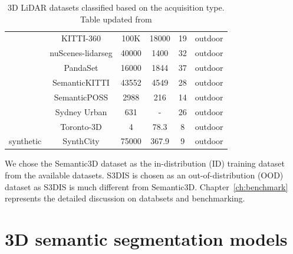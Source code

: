 \begin{table}[h!]
\begin{tabular}{c|c|c|c|c|c}
                                        & KITTI-360\cite{Xie_2016_CVPR_KITTI_360} & 100K & 18000 & 19 & outdoor\\ %
                                        & nuScenes-lidarseg\cite{caesar2020nuscenes} & 40000 & 1400 & 32& outdoor\\ %
                                        & PandaSet\cite{PandaSet} & 16000 & 1844 & 37 & outdoor \\ %
                                        & SemanticKITTI\cite{Behley_2019_ICCV} & 43552 & 4549 & 28 & outdoor \\ %
                                        & SemanticPOSS\cite{pan2020semanticposs} & 2988 & 216 & 14 & outdoor \\ %
                                        & Sydney Urban\cite{de2013unsupervised} & 631 & - & 26 & outdoor\\ %
                                        & Toronto-3D\cite{tan2020toronto3d} & 4 & 78.3& 8& outdoor\\ %
    
            \hline
            \multirow{1}{*}{synthetic}  & SynthCity\cite{griffiths2019synthcity} & 75000 & 367.9 & 9 & outdoor \\ %
            \hline
        \end{tabular}
        \caption{3D LiDAR datasets classified based on the acquisition type. Table updated from \cite{survey3d}}
        \label{table:3d_lidar_datasets_table}
    \end{table}
    
    We chose the Semantic3D dataset as the in-distribution (ID) training dataset from the available datasets. 
    S3DIS is chosen as an out-of-distribution (OOD) dataset as S3DIS is much different from Semantic3D.
    Chapter~\ref{ch:benchmark} represents the detailed discussion on databsets and benchmarking.

    \section{3D semantic segmentation models}

